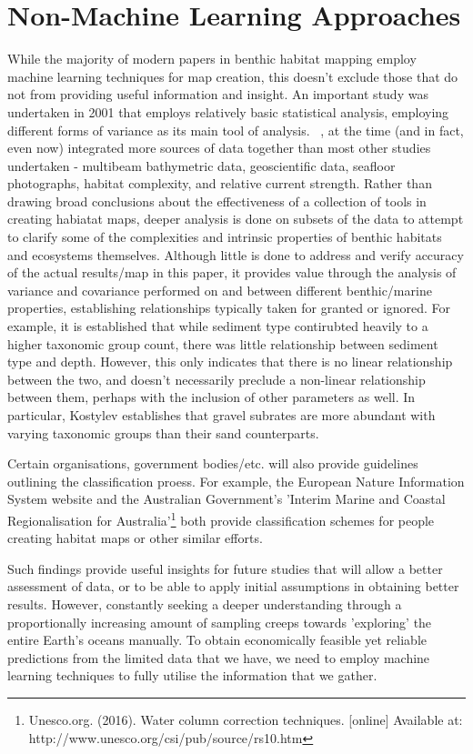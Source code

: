 \section{Non-Machine Learning Approaches} 
 While the majority of modern papers in benthic habitat mapping employ machine learning techniques for map creation, this doesn't exclude those that do not from providing useful information and insight. An important study was undertaken in 2001 that employs relatively basic statistical analysis, employing different forms of variance as its main tool of analysis. ~\citep{kostylev01}, at the time (and in fact, even now) integrated more sources of data together than most other studies undertaken - multibeam bathymetric data, geoscientific data, seafloor photographs, habitat complexity, and relative current strength. Rather than drawing broad conclusions about the effectiveness of a collection of tools in creating habiatat maps, deeper analysis is done on subsets of the data to attempt to clarify some of the complexities and intrinsic properties of benthic habitats and ecosystems themselves. Although little is done to address and verify accuracy of the actual results/map in this paper, it provides value through the analysis of variance and covariance performed on and between different benthic/marine properties, establishing relationships typically taken for granted or ignored. For example, it is established that while sediment type contirubted heavily to a higher taxonomic group count, there was little relationship between sediment type and depth. However, this only indicates that there is no linear relationship between the two, and doesn't necessarily preclude a non-linear relationship between them, perhaps with the inclusion of other parameters as well. In particular, Kostylev establishes that gravel subrates are more abundant with varying taxonomic groups than their sand counterparts.

Certain organisations, government bodies/etc. will also provide guidelines outlining the classification proess. For example, the European Nature Information System website and the Australian Government's 'Interim Marine and Coastal Regionalisation for Australia'\footnote{Unesco.org. (2016). Water column correction techniques. [online] Available at: http://www.unesco.org/csi/pub/source/rs10.htm} both provide classification schemes for people creating habitat maps or other similar efforts.

Such findings provide useful insights for future studies that will allow a better assessment of data, or to be able to apply initial assumptions in obtaining better results. However, constantly seeking a deeper understanding through a proportionally increasing amount of sampling creeps towards 'exploring' the entire Earth's oceans manually. To obtain economically feasible yet reliable predictions from the limited data that we have, we need to employ machine learning techniques to fully utilise the information that we gather.

